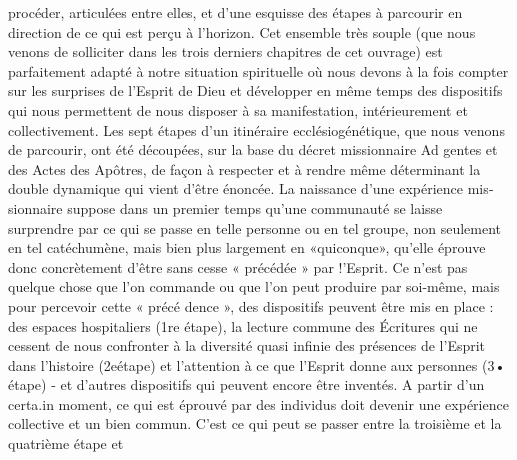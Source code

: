 { 
procéder, articulées entre elles, et d'une esquisse des étapes à parcourir en direction de ce qui est perçu à l'horizon. Cet ensemble très souple (que nous venons de solliciter dans les trois derniers chapitres de cet ouvrage) est parfaitement adapté à notre situation spirituelle où nous devons à la fois compter sur les surprises de l'Esprit de Dieu et développer en même temps des dispositifs qui nous permettent de nous disposer à sa manifestation, intérieurement et collectivement.
Les sept étapes d'un itinéraire ecclésiogénétique, que nous venons de parcourir, ont été découpées, sur la base du décret missionnaire Ad gentes et des Actes des Apôtres, de façon à respecter et à rendre même déterminant la double dynamique qui vient d'être énoncée. La naissance d'une expérience mis­ sionnaire suppose dans un premier temps qu'une communauté se laisse surprendre par ce qui se passe en telle personne ou en tel groupe, non seulement en tel catéchumène, mais bien plus largement en «quiconque», qu'elle éprouve donc concrètement d'être sans cesse « précédée » par !'Esprit. Ce n'est pas quelque chose que l'on commande ou que l'on peut produire par soi-même, mais pour percevoir cette « précé­ dence », des dispositifs peuvent être mis en place : des espaces hospitaliers (1re étape), la lecture commune des Écritures qui ne cessent de nous confronter à la diversité quasi infinie des présences de l'Esprit dans l'histoire (2eétape) et l'attention à ce que l'Esprit donne aux personnes (3• étape) - et d'autres dispositifs qui peuvent encore être inventés. A partir d'un certa.in moment, ce qui est éprouvé par des individus doit devenir une expérience collective et un bien commun. C'est ce qui peut se passer entre la troisième et la quatrième étape et
 
}
